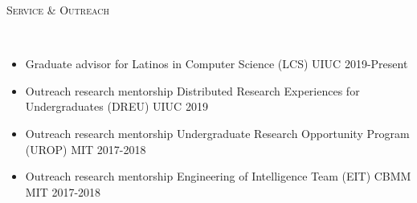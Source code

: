 \documentclass{article}
\newenvironment{changemargin}[2]{%
  \begin{list}{}{%
    \setlength{\topsep}{0pt}%
    \setlength{\leftmargin}{#1}%
    \setlength{\rightmargin}{#2}%
    \setlength{\listparindent}{\parindent}%
    \setlength{\itemindent}{\parindent}%
    \setlength{\parsep}{\parskip}%
  }%
  \item[]}{\end{list}
}
\newcommand{\lineover}{
	\begin{changemargin}{-0.05in}{-0.05in}
		\vspace*{-8pt}
		\hrulefill \\
		\vspace*{-2pt}
	\end{changemargin}
}
\newcommand{\header}[1]{
	\begin{changemargin}{-0.5in}{-0.5in}
		\scshape{#1}\\
  	\lineover
	\end{changemargin}
}
\newenvironment{body} {
	\vspace*{-16pt}
	\begin{changemargin}{-0.25in}{-0.5in}
  }	
	{\end{changemargin}
}
\begin{document}

\header{Service \& Outreach}

\begin{body}

\vspace{16pt}
\begin{itemize}
    \item Graduate advisor for Latinos in Computer Science (LCS) UIUC 2019-Present
    \item Outreach research mentorship Distributed Research Experiences for Undergraduates (DREU) UIUC 2019
    \item Outreach research mentorship Undergraduate Research Opportunity Program (UROP) MIT 2017-2018 
    \item Outreach research mentorship Engineering of Intelligence Team (EIT) CBMM MIT 2017-2018
\end{itemize}

\end{body}

\newpage

\end{document}
